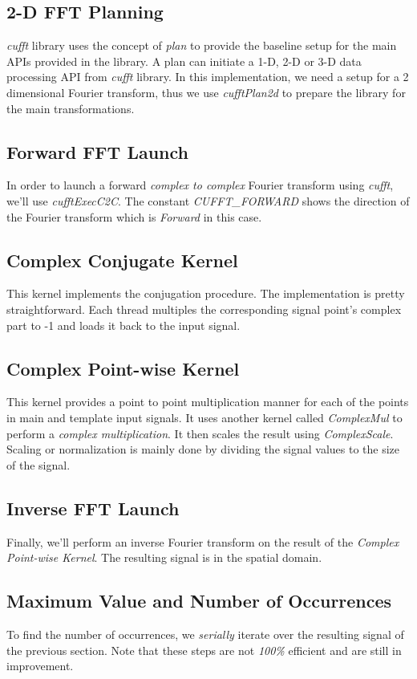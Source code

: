 \subsection{2-D FFT Planning}
\textit{cufft} library uses the concept of \textit{plan} to provide the baseline setup for the main APIs provided in the library. A plan can initiate a 1-D, 2-D or 3-D data processing API from \textit{cufft} library. In this implementation, we need a setup for a 2 dimensional Fourier transform, thus we use \textit{cufftPlan2d} to prepare the library for the main transformations.

\subsection{Forward FFT Launch}
In order to launch a forward \textit{complex to complex} Fourier transform using \textit{cufft}, we'll use \textit{cufftExecC2C}. The constant \textit{CUFFT\_FORWARD} shows the direction of the Fourier transform which is \textit{Forward} in this case.

\subsection{Complex Conjugate Kernel}
This kernel implements the conjugation procedure. The implementation is pretty straightforward. Each thread multiples the corresponding signal point's complex part to -1 and loads it back to the input signal.

\subsection{Complex Point-wise Kernel}
This kernel provides a point to point multiplication manner for each of the points in main and template input signals. It uses another kernel called \textit{ComplexMul} to perform a \textit{complex multiplication}. It then scales the result using \textit{ComplexScale}. Scaling or normalization is mainly done by dividing the signal values to the size of the signal.

\subsection{Inverse FFT Launch}
Finally, we'll perform an inverse Fourier transform on the result of the \textit{Complex Point-wise Kernel}. The resulting signal is in the spatial domain.

\subsection{Maximum Value and Number of Occurrences}
To find the number of occurrences, we \textit{serially} iterate over the resulting signal of the previous section. Note that these steps are not \textit{100\%} efficient and are still in improvement.